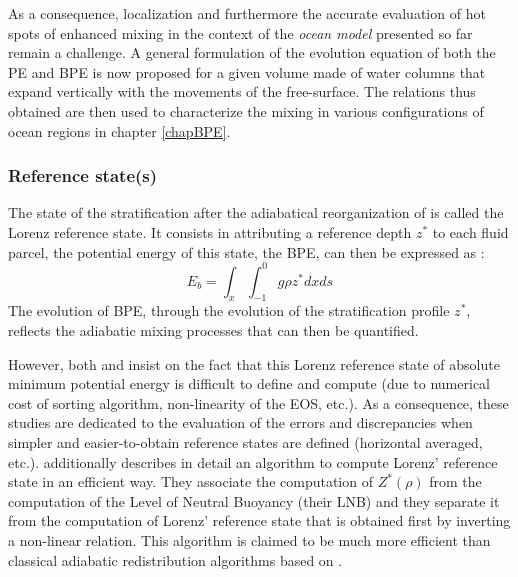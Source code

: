 As a consequence, localization and furthermore the accurate evaluation of hot spots of enhanced mixing in the context of the \textit{ocean model} presented so far remain a challenge. A general formulation of the evolution equation of both the PE and BPE is now proposed for a given volume made of water columns that expand vertically with the movements of the free-surface. The relations thus obtained are then used to characterize the mixing in various configurations of ocean regions in chapter \ref{chapBPE}.


\subsubsection{Reference state(s)}

The state of the stratification after the adiabatical reorganization of \citet{lorenz_available_1955} is called the Lorenz reference state. It consists in attributing a reference depth $z^*$ to each fluid parcel, the potential energy of this state, the BPE, can then be expressed as :
\begin{equation}
    E_b = \int_x \int_{-1}^0 g \rho z^* dx ds
\end{equation}
The evolution of BPE, through the evolution of the stratification profile $z^*$, reflects the adiabatic mixing processes that can then be quantified.

However, both \cite{saenz_estimating_2015} and \cite{tailleux_local_2018} insist on the fact that this Lorenz reference state of absolute minimum potential energy is difficult to define and compute (due to numerical cost of sorting algorithm, non-linearity of the EOS, etc.). As a consequence, these studies are dedicated to the evaluation of the errors and discrepancies when simpler and easier-to-obtain reference states are defined (horizontal averaged, etc.). \cite{saenz_estimating_2015} additionally describes in detail an algorithm to compute Lorenz' reference state in an efficient way. They associate the computation of $Z^*(\rho)$ from the computation of the Level of Neutral Buoyancy (their LNB) and they separate it from the computation of Lorenz' reference state that is obtained first by inverting a non-linear relation. This algorithm is claimed to be much more efficient than classical adiabatic redistribution algorithms based on \citet{winters_available_1995}.

